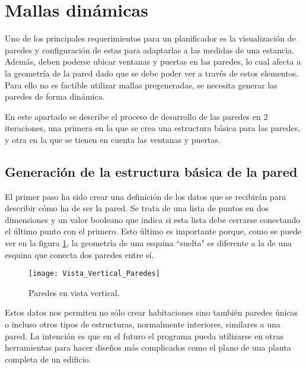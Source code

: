 \section{Mallas dinámicas}
\label{walls_holes}
Uno de los principales requerimientos para un planificador es la visualización de paredes y configuración de estas para adaptarlas a las medidas de una estancia. Además, deben poderse ubicar ventanas y puertas en las paredes, lo cual afecta a la geometría de la pared dado que se debe poder ver a través de estos elementos. Para ello no es factible utilizar mallas pregeneradas, se necesita generar las paredes de forma dinámica.

En este apartado se describe el proceso de desarrollo de las paredes en 2 iteraciones, una primera en la que se crea una estructura básica para las paredes, y otra en la que se tienen en cuenta las ventanas y puertas.

\subsection{Generación de la estructura básica de la pared}
\label{subsec:gen1}
El primer paso ha sido crear una definición de los datos que se recibirán para describir cómo ha de ser la pared. Se trata de una lista de puntos en dos dimensiones y un valor booleano que indica si esta lista debe cerrarse conectando el último punto con el primero. Esto último es importante porque, como se puede ver en la figura \ref{fig:vertical_view_walls}, la geometría de una esquina ``suelta" es diferente a la de una esquina que conecta dos paredes entre sí.

\begin{figure}[h]
    \centering
    \texttt{[image: Vista\_Vertical\_Paredes]}
    \caption{Paredes en vista vertical.}
    \label{fig:vertical_view_walls}
\end{figure}

Estos datos nos permiten no sólo crear habitaciones sino también paredes únicas o incluso otros tipos de estructuras, normalmente interiores, similares a una pared. La intención es que en el futuro el programa pueda utilizarse en otras herramientas para hacer diseños más complicados como el plano de una planta completa de un edificio.


